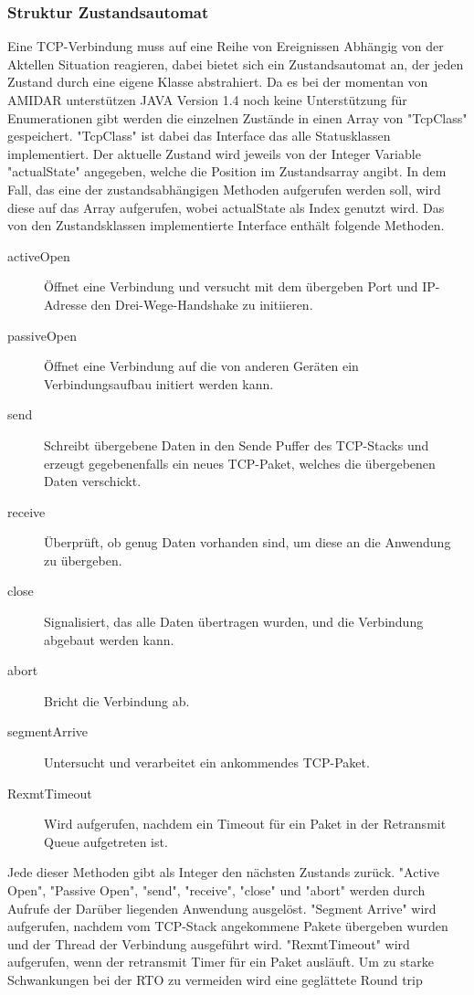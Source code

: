 \subsubsection{Struktur Zustandsautomat}
Eine TCP-Verbindung muss auf eine Reihe von Ereignissen Abhängig von der Aktellen Situation reagieren, dabei bietet sich ein Zustandsautomat an, der jeden Zustand durch eine eigene Klasse abstrahiert. Da es bei der momentan von AMIDAR unterstützen JAVA Version 1.4 noch keine Unterstützung für Enumerationen gibt werden die einzelnen Zustände in einen Array von "{}TcpClass"{} gespeichert. "{}TcpClass{}" ist dabei das Interface das alle Statusklassen implementiert. Der aktuelle Zustand wird jeweils von der Integer Variable {}"actualState"{} angegeben, welche die Position im Zustandsarray angibt. In dem Fall, das eine der zustandsabhängigen Methoden aufgerufen werden soll, wird diese auf das Array aufgerufen, wobei actualState als Index genutzt wird. Das von den Zustandsklassen implementierte Interface enthält folgende Methoden.  
\begin{description}
\item[activeOpen] Öffnet eine Verbindung und versucht mit dem übergeben Port und IP-Adresse den Drei-Wege-Handshake zu initiieren. 
\item[passiveOpen] Öffnet eine Verbindung auf die von anderen Geräten ein Verbindungsaufbau initiert werden kann. 
\item[send] Schreibt übergebene Daten in den Sende Puffer des TCP-Stacks und erzeugt gegebenenfalls ein neues TCP-Paket, welches die übergebenen Daten verschickt. 
\item[receive] Überprüft, ob genug Daten vorhanden sind, um diese an die Anwendung zu übergeben. 
\item[close] Signalisiert, das alle Daten übertragen wurden, und die Verbindung abgebaut werden kann. 
\item[abort] Bricht die Verbindung ab.
\item[segmentArrive] Untersucht und verarbeitet ein ankommendes TCP-Paket.
\item[RexmtTimeout] Wird aufgerufen, nachdem ein Timeout für ein Paket in der Retransmit Queue aufgetreten ist. 
\end{description}
Jede dieser Methoden gibt als Integer den nächsten Zustands zurück. {}"Active Open"{}, {}"Passive Open"{}, {}"send"{}, {}"receive"{}, {}"close"{} und "{}abort"{} werden durch Aufrufe der Darüber liegenden Anwendung ausgelöst. {}"Segment Arrive"{} wird aufgerufen, nachdem vom TCP-Stack angekommene Pakete übergeben wurden und der Thread der Verbindung ausgeführt wird. 
{}"RexmtTimeout"{} wird aufgerufen, wenn der retransmit Timer für ein Paket ausläuft. Um zu starke Schwankungen bei der RTO zu vermeiden wird eine geglättete Round trip

